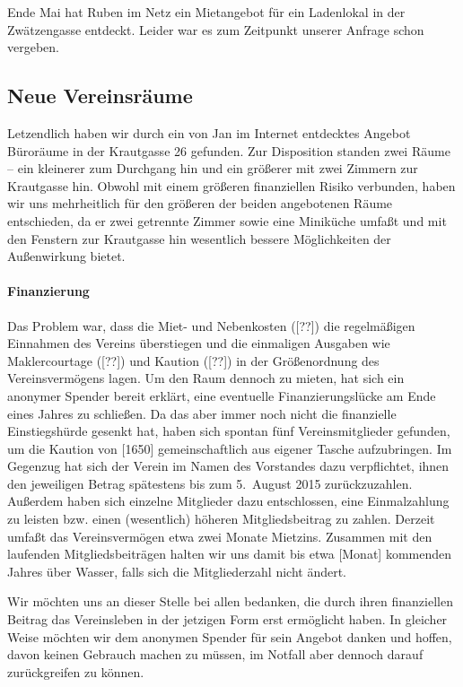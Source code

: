 \documentclass[10pt,DIV16]{scrartcl}
\begin{document}
Ende Mai hat Ruben im Netz ein Mietangebot für ein Ladenlokal in der
Zwätzengasse entdeckt.  Leider war es zum Zeitpunkt unserer Anfrage schon
vergeben.

\subsection{Neue Vereinsräume}

Letzendlich haben wir durch ein von Jan im Internet entdecktes Angebot
Büroräume in der Krautgasse 26 gefunden.  Zur Disposition standen zwei Räume
-- ein kleinerer zum Durchgang hin und ein größerer mit zwei Zimmern zur
Krautgasse hin.  Obwohl mit einem größeren finanziellen Risiko verbunden,
haben wir uns mehrheitlich für den größeren der beiden angebotenen Räume
entschieden, da er zwei getrennte Zimmer sowie eine Miniküche umfaßt und mit
den Fenstern zur Krautgasse hin wesentlich bessere Möglichkeiten der
Außenwirkung bietet.

\paragraph{Finanzierung}

Das Problem war, dass die Miet- und Nebenkosten ([??\EUR]) die regelmäßigen
Einnahmen des Vereins überstiegen und die einmaligen Ausgaben wie
Maklercourtage ([??\EUR]) und Kaution ([??\EUR]) in der Größenordnung des
Vereinsvermögens lagen.  Um den Raum dennoch zu mieten, hat sich ein anonymer
Spender bereit erklärt, eine eventuelle Finanzierungslücke am Ende eines
Jahres zu schließen.  Da das aber immer noch nicht die finanzielle
Einstiegshürde gesenkt hat, haben sich spontan fünf Vereinsmitglieder
gefunden, um die Kaution von [1650\EUR] gemeinschaftlich aus eigener Tasche
aufzubringen.  Im Gegenzug hat sich der Verein im Namen des Vorstandes dazu
verpflichtet, ihnen den jeweiligen Betrag spätestens bis zum 5.\ August 2015
zurückzuzahlen.  Außerdem haben sich einzelne Mitglieder dazu entschlossen,
eine Einmalzahlung zu leisten bzw. einen (wesentlich) höheren Mitgliedsbeitrag
zu zahlen.  Derzeit umfaßt das Vereinsvermögen etwa zwei Monate Mietzins.
Zusammen mit den laufenden Mitgliedsbeiträgen halten wir uns damit bis etwa
[Monat] kommenden Jahres über Wasser, falls sich die Mitgliederzahl nicht
ändert.

Wir möchten uns an dieser Stelle bei allen bedanken, die durch ihren
finanziellen Beitrag das Vereinsleben in der jetzigen Form erst ermöglicht
haben.  In gleicher Weise möchten wir dem anonymen Spender für sein Angebot
danken und hoffen, davon keinen Gebrauch machen zu müssen, im Notfall aber
dennoch darauf zurückgreifen zu können.
\end{document}
